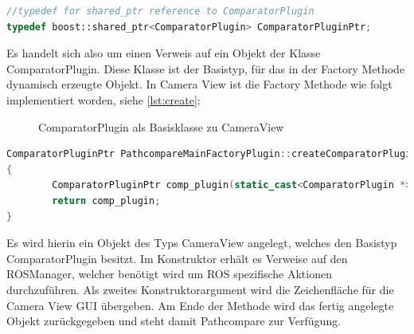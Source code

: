\begin{lstlisting}[caption=ROS transformation message, language=C++, basicstyle=\footnotesize, label=lst:returntypedef]
//typedef for shared_ptr reference to ComparatorPlugin
typedef boost::shared_ptr<ComparatorPlugin> ComparatorPluginPtr;
\end{lstlisting}

Es handelt sich also um einen Verweis auf ein Objekt der Klasse
ComparatorPlugin. Diese Klasse ist der Basistyp, für das in der Factory Methode
dynamisch erzeugte Objekt. In Camera View ist die Factory Methode wie folgt
implementiert worden, siehe \autoref{lst:create}:

 \begin{figure}[t]
   \begin{center}
   \end{center}
   \caption{ComparatorPlugin als Basisklasse zu CameraView}
   \label{fig:cameraviewcomparator}
 \end{figure}

\begin{lstlisting}[caption=ROS transformation message, language=C++, basicstyle=\footnotesize, label=lst:create]
ComparatorPluginPtr PathcompareMainFactoryPlugin::createComparatorPlugin(ROSManager * ros_manager, QWidget *tab_widget) const
{
        ComparatorPluginPtr comp_plugin(static_cast<ComparatorPlugin *>(new CameraView(ros_manager, tab_widget)));
        return comp_plugin;
}
\end{lstlisting}

Es wird hierin ein Objekt des Typs CameraView angelegt, welches den Basistyp
ComparatorPlugin besitzt. Im Konstruktor erhält es Verweise auf den ROSManager,
welcher benötigt wird um ROS spezifische Aktionen durchzuführen. Als zweites
Konstruktorargument wird die Zeichenfläche für die Camera View GUI übergeben.
Am Ende der Methode wird das fertig angelegte Objekt zurückgegeben und steht
damit Pathcompare zur Verfügung. 

